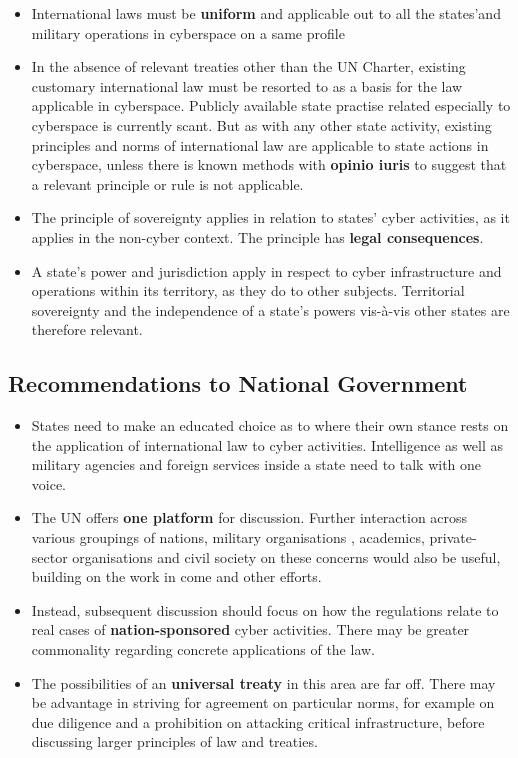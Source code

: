 \documentclass{article}
\begin{document}
\begin{itemize}
\item International laws must be \textbf{uniform} and applicable out to all the states’and military operations in cyberspace on a same profile 
\item In the absence of relevant treaties other than the UN Charter, existing customary international law must be resorted to as a basis for the law applicable in cyberspace. Publicly available state practise related especially to cyberspace is currently scant. But as with any other state activity, existing principles and norms of international law are applicable to state actions in cyberspace, unless there is known methods with \textbf{opinio iuris} to suggest that a relevant principle or rule is not applicable.
\item The principle of sovereignty applies in relation to states’ cyber activities, as it applies in the non-cyber context. The principle has \textbf{legal consequences}.
\item A state’s power and jurisdiction apply in respect to cyber infrastructure and operations within its territory, as they do to other subjects. Territorial sovereignty and the independence of a state’s powers vis-à-vis other states are therefore relevant.
\end{itemize}

\subsection{Recommendations to National Government}

\begin{itemize}
\item States need to make an educated choice as to where their own stance rests on the application of international law to cyber activities. Intelligence as well as military agencies and foreign services inside a state need to talk with one voice.
\item The UN offers \textbf{one platform} for discussion. Further interaction across various groupings of nations, military organisations , academics, private-sector organisations and civil society on these concerns would also be useful, building on the work in come and other efforts.
\item Instead, subsequent discussion should focus on how the regulations relate to real cases of \textbf{nation-sponsored} cyber activities. There may be greater commonality regarding concrete applications of the law.
\item The possibilities of an \textbf{universal treaty} in this area are far off. There may be advantage in striving for agreement on particular norms, for example on due diligence and a prohibition on attacking critical infrastructure, before discussing larger principles of law and treaties.
\end{itemize}
\end{document}
